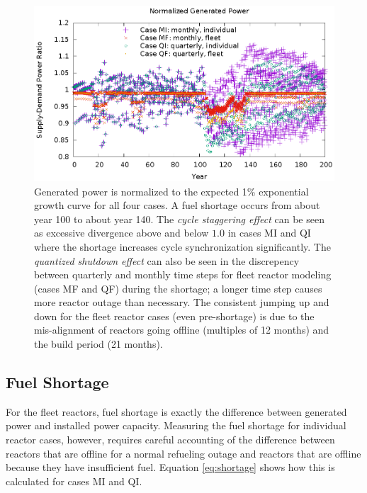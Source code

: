 \documentclass{style}
\begin{document}
\begin{figure}[!h]
    \centering
    \includegraphics[width=1.0\textwidth]{exp2/power-rel.eps}
    \caption[Normalized power]{
        Generated power is normalized to the expected 1\% exponential growth
        curve for all four cases.  A fuel shortage occurs from about year 100
        to about year 140.  The \emph{cycle staggering effect} can be seen as
        excessive divergence above and below $1.0$ in cases MI and QI where
        the shortage increases cycle synchronization significantly. The
        \emph{quantized shutdown effect} can also be seen in the discrepency
        between quarterly and monthly time steps for fleet reactor modeling
        (cases MF and QF) during the shortage; a longer time step causes more
        reactor outage than necessary. The consistent jumping up and down for
        the fleet reactor cases (even pre-shortage) is due to the mis-alignment of reactors going
        offline (multiples of 12 months) and the build period (21 months).
    }
    \label{fig:power-rel}
\end{figure}

\subsection{Fuel Shortage}

For the fleet reactors, fuel shortage is exactly the
difference between generated power and installed power capacity. Measuring the
fuel shortage for individual reactor cases, however, requires careful
accounting of the difference between reactors that are offline for a normal
refueling outage and reactors that are offline because they have insufficient
fuel. Equation \ref{eq:shortage} shows how this is calculated for cases MI and
QI.
\end{document}
